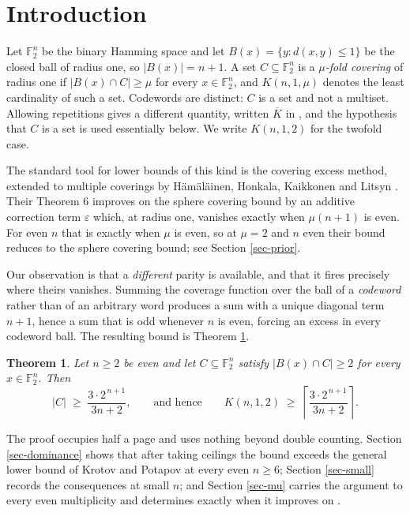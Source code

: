 \documentclass[10pt,a4paper]{article}
\newtheorem{theorem}{Theorem}[section]
\begin{document}
\baselineskip=0.20in

\section{Introduction}

Let $\mathbb{F}_2^n$ be the binary Hamming space and let
$B(x)=\{y: d(x,y)\le 1\}$ be the closed ball of radius one, so $|B(x)|=n+1$.
A set $C\subseteq\mathbb{F}_2^n$ is a \emph{$\mu$-fold covering} of radius one
if $|B(x)\cap C|\ge\mu$ for every $x\in\mathbb{F}_2^n$, and $K(n,1,\mu)$ denotes
the least cardinality of such a set. Codewords are distinct: $C$ is a set and
not a multiset. Allowing repetitions gives a different quantity, written
$\overline{K}$ in \cite{HHKL-1993}, and the hypothesis that $C$ is a set is used
essentially below. We write $K(n,1,2)$ for the twofold case.

The standard tool for lower bounds of this kind is the covering excess method,
extended to multiple coverings by H\"am\"al\"ainen, Honkala, Kaikkonen and
Litsyn \cite{HHKL-1993}. Their Theorem 6 improves on the sphere covering bound
by an additive correction term $\varepsilon$ which, at radius one, vanishes
exactly when $\mu(n+1)$ is even. For even $n$ that is exactly when $\mu$ is
even, so at $\mu=2$ and $n$ even their bound reduces to the sphere covering
bound; see Section \ref{sec-prior}.

Our observation is that a \emph{different} parity is available, and that it
fires precisely where theirs vanishes. Summing the coverage function over the
ball of a \emph{codeword} rather than of an arbitrary word produces a sum with
a unique diagonal term $n+1$, hence a sum that is odd whenever $n$ is even,
forcing an excess in every codeword ball. The resulting bound is Theorem
\ref{thm-main}.

\begin{theorem}\label{thm-main}
Let $n\ge 2$ be even and let $C\subseteq\mathbb{F}_2^n$ satisfy
$|B(x)\cap C|\ge 2$ for every $x\in\mathbb{F}_2^n$. Then
\[
  |C| \;\ge\; \frac{3\cdot 2^{\,n+1}}{3n+2},
  \qquad\text{and hence}\qquad
  K(n,1,2) \;\ge\; \left\lceil \frac{3\cdot 2^{\,n+1}}{3n+2} \right\rceil .
\]
\end{theorem}

The proof occupies half a page and uses nothing beyond double counting. Section
\ref{sec-dominance} shows that after taking ceilings the bound exceeds the
general lower bound of Krotov and Potapov \cite{KP-2021} at every even
$n\ge 6$; Section \ref{sec-small} records the consequences at small $n$; and
Section \ref{sec-mu} carries the argument to every even multiplicity and
determines exactly when it improves on \cite{KP-2021}.
\end{document}
